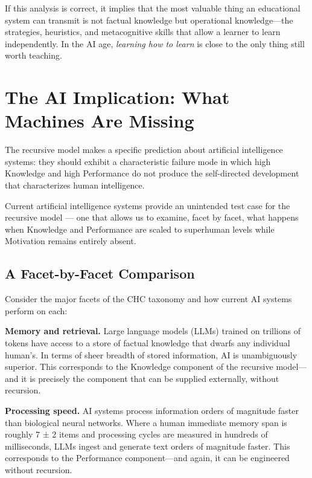 \documentclass[12pt,a4paper]{article}
\begin{document}
If this analysis is correct, it implies that the most valuable thing an educational system can transmit is not factual knowledge but operational knowledge---\hspace{0pt}the strategies, heuristics, and metacognitive skills that allow a learner to learn independently. In the AI age, \emph{learning how to learn} is close to the only thing still worth teaching.


\section{The AI Implication: What Machines Are Missing}

The recursive model makes a specific prediction about artificial intelligence systems: they should exhibit a characteristic failure mode in which high Knowledge and high Performance do not produce the self-directed development that characterizes human intelligence.

Current artificial intelligence systems provide an unintended test case for the recursive model ---\hspace{0pt} one that allows us to examine, facet by facet, what happens when Knowledge and Performance are scaled to superhuman levels while Motivation remains entirely absent.

\subsection{A Facet-by-Facet Comparison}

Consider the major facets of the CHC taxonomy and how current AI systems perform on each:

\textbf{Memory and retrieval.} Large language models (LLMs) trained on trillions of tokens have access to a store of factual knowledge that dwarfs any individual human's. In terms of sheer breadth of stored information, AI is unambiguously superior. This corresponds to the Knowledge component of the recursive model---\hspace{0pt}and it is precisely the component that can be supplied externally, without recursion.

\textbf{Processing speed.} AI systems process information orders of magnitude faster than biological neural networks. Where a human immediate memory span is roughly 7 ± 2 items \citep{Miller1956} and processing cycles are measured in hundreds of milliseconds, LLMs ingest and generate text orders of magnitude faster. This corresponds to the Performance component---\hspace{0pt}and again, it can be engineered without recursion.
\end{document}
